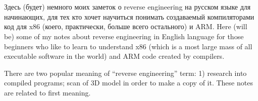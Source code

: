 ﻿\chapter{}

\IFRU
{Здесь (будет) немного моих заметок о reverse engineering на русском языке для начинающих, 
для тех кто хочет научиться понимать создаваемый \CCpp компиляторами код для x86 (коего, 
практически, больше всего остального) и ARM.}
{Here (will be) some of my notes about reverse engineering in English language for 
those beginners who like to learn to understand x86 (which is a most large mass of 
all executable software in the world) and ARM code created by \CCpp compilers.}

{There are two popular meaning of ``reverse engineering'' term: 1) research into compiled programs;
scan of 3D model in order to make a copy of it. These notes are related to first meaning.}


